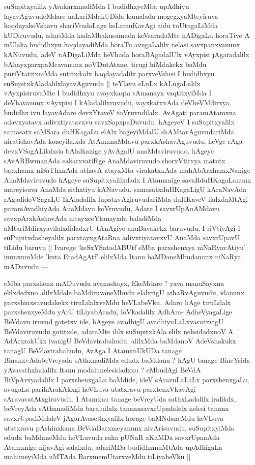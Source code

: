\begin{artha}
suSupitxyalilx yAvakarxmadiMda I budidhxyeMba upAdhiyu
layavAguvudeMdare naLariMdakUDida kamalada mogegxyaMteyiruva
haqdayakoVshavu shariVradoLage keLamuKavAgi aidu tuUtugaLiMda
kUDiruvudu, adariMda kadaMbakusumada keVsaradaMte nADigaLu horaTive A
mUlaka budidhxyu haqdayadiMda horaTu avugaLalilx nelasi savxpanxvanunx
kANuvudu, adeV nADigaLiMda heVhada horaBAgadalUlx vAyxpisi
jAgaradalilx bAhayxparxpaMcavanunx noVDutAtxne, tirugi hiMdakekx baMdu
puriVtatitxniMda sutitxdadx haqdayadalilx parxveVshisi I budidhxyu
suSupitxkAladalilxlayavAguvudu || teYlavu eLuLx kALugaLalilx
vAyxpisiruvaMte I budidhxyu avayxkaqta sAmanayx vaqtitxyiMda I
deVhavanunx vAyxpisi I kAladalilxruvudu, vayxkatxvAda deVheVMdirxya,
budidhx ivu layavAdare devxYtaveV toVruvudilalx. AvAgati paramAtamxna
adavxyatavx adivxtiyatavxvu savxSapxpaDuvudu. hAgeyeV I suSupitxyalilx
samasatx saMSara duHKagaLu elAlx bageyiMdalU shAMtavAguvudariMda
niratishavAda koneyilalxda AtAmxnaMdavu parxkAshavAguvudu, heVge rAga
devxVSagALilalxda bAlalkanige yAvAgalU  anaMdaviruvudo, hAgeye
sAvARBwmanAda cakarxvatiRge AnaMdaviruvudo.shorxVtirxya  matutx
barxhamx niSaThxnAda athavA atayxMta virakatxnAda 
mahAbArxhamxNanige AnaMdaviruvudo hAgeye suSupitxyalilxdadx I
Atamxnige savaRduHKagaLanunx mareyisuva AnaMda sithxtiyu kANavudu,
samasatxduHKagaLigU kAraNavAda rAgadidoVSagaLU IkAladalilx
lupatxvAgiruvudariMda duHKaveV ilalxdaMtAgi paramAvadhiyAda AnaMdavu
koVruvudu, Adare I savxrUpAnAMdavu savxpArxkAshavAda nitayxceYtanayxda
baladiMda aMtariMdirxyavilalxdidadxrU tAnAgiye anuBavakekx baruvudu, I
riVtiyAgi I suPupitxdasheyalilx parxtayxgAtaRna adivxtiyatavxvU AnaMda
savxrUpavU tiLidu baruvu || Ivarege `keSxYSatadABUtf eMba parxshenxya
niNaRyavAtiyu' inunxmuMde 'kuta EtadAgAtf' elilxMda Itanu
baMDaneMbudanunx niNaRya mADuvudu ---
\end{artha}


\begin{artha}
eMba parxshenx mADuvudu avanashayx, EkeMdare ? yava manuSayxnu
elilxdedxno alilxMdale baMdiruvaneMbudu elalxrigU athaRvAguvudu,
idanunx parxshinxsuvudakekx tiruLilalxveMdu heVLabeVku. Adaro hAge
tiruLilalx parxshenxyeMdu yArU tiLiyabAradu, loVkadalilx AdhAra-
AdheVyagaLige BeVdavu iruvud gotetxv ide, hAgeye avadhigU
avadhiyuLaLxvasutxvigU BeVdaviruvudu gotitxde, adaraMte ililx suSupitxkAla
elilx nelisidadxnoV A AdArxrakUkx ivanigU BeVdavirabahudu. alilxMda
baMdanoV AdeVshakukx tanagU BeVdavirabahudu, AvAga  I AtamxnUkUDa
tanage BinanxvAdabeVreyada sAthxnadiMda edudx baMdanu ? hAgU tanage
BineYsida yAvasathxladalilx Itanu modalunelesidadxnu ? eMbudAgi BeVdA
BiVpArxyadalilx I parxshenxgaLu baMdide, ideV sAravuLaLaLx
parxshenxgaLu, avugaLa parihArakAkxgi heVLuva utatxravu
parxtenxVkavAgi sAravavatAtxgiruvudu, I Atamxnu tanage beVreyUda
sathxLadalilx iralilalx, beVreyAda sAthxnadiMda baraluilalx
tananxsavxrUpadalelx nelesi tananx savxrUpadiMdaleV
jAgarAvasethxyalilx horage baMNdaneMdu heVLuva utatxravu pAshinxkana
BeVdaBarxmeyanunx nivArisuvudu, suSupitxyiMda edudx baMdaneMdu
heVLuvuda saha pUNaR aKaMDa savxrUpanAda Atamxnige nijavAgi salalxdu,
adariMDa budidhxmuMtAda upAdhigaLa mahimeyiMda uMTAda
BarxmemUtarxveMdu tiLiyabeVku ||
\end{artha}


